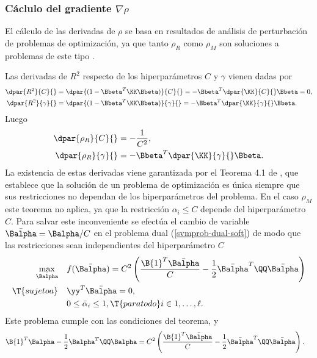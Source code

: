 %
\subsubsection{Cáclulo del gradiente $\nabla\rho$}
%
El cálculo de las derivadas de $\rho$ se basa en resultados de
análisis de perturbación de problemas de optimización, ya que tanto
$\rho_R$ como $\rho_M$ son soluciones a problemas de este tipo \cite{chung}.

Las derivadas de $R^2$ respecto de los hiperparámetros $C$ y $\gamma$ vienen
dadas por
%
\begin{align}
  \dpar{R^2}{C}{} &= \dpar{(1-\Bbeta^T\KK\Bbeta)}{C}{}
  = -\Bbeta^T \dpar{\KK}{C}{}\Bbeta = 0, \\
  \dpar{R^2}{\gamma}{} &= \dpar{(1-\Bbeta^T\KK\Bbeta)}{\gamma}{}
  = -\Bbeta^T \dpar{\KK}{\gamma}{}\Bbeta.
\end{align}
%
Luego
%
\begin{align}
  \dpar{\rho_R}{C}{} &= -\frac{1}{C^2}, \\
  \dpar{\rho_R}{\gamma}{} &= -\Bbeta^T \dpar{\KK}{\gamma}{}\Bbeta.
\end{align}
%
La existencia de estas derivadas viene garantizada por el Teorema 4.1 de
\cite{bonnans-shapiro}, que establece que la solución de un problema
de optimización es única siempre que sus restricciones no dependan de
los hiperparámetros del problema. En el caso $\rho_M$ este teorema no aplica, ya que
la restricción $\alpha_i\leq{}C$ depende del hiperparámetro $C$.
Para salvar este inconveniente se efectúa el cambio de
variable $\bar{\Balpha}=\Balpha/C$ en el problema dual
(\ref{svmprob-dual-soft}) de modo que las restricciones sean
independientes del hiperparámetro $C$
%
\begin{align}
\begin{split}
    \max_{\bar{\Balpha}}\quad&
    f(\bar{\Balpha}) = C^2 \left( \frac{\B{1}^T\bar{\Balpha}}{C}
    -\frac{1}{2}\bar{\Balpha}^T\QQ\bar{\Balpha}\right)\\
    \T{sujeto a}\quad & \yy^T\bar{\Balpha} = 0, \\
    & 0\leq\bar{\alpha}_i\leq 1,
    \T{ para todo } i\in {1,\ldots,\ell }.
\end{split}\end{align}
%
Este problema cumple con las condiciones del teorema, y
%
\begin{align}
\label{eq:rmb-alpha-equiv}
  \B{1}^T\Balpha-\frac{1}{2}\Balpha^T\QQ\Balpha
  &= C^2\left(\frac{\B{1}^T\bar{\Balpha}}{C} -
  \frac{1}{2}\bar{\Balpha}^T\QQ\bar{\Balpha}\right).
\end{align}
